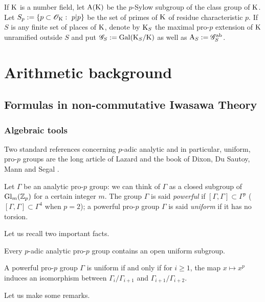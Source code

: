 \documentclass[12pt,a4paper,twoside,english]{smfart}
\def\K{{\rm K}}
\def\Z{{\mathbb Z}}
\def\G{{\mathcal G}}
\def\O{{\mathcal O}}
\def\p{{\mathfrak p}}
\def\Gl{{\rm Gl}}
\def\Gal{{\rm Gal}}
\def\ab{{\mathrm{ab}}}
\def\A{{\rm A}}
\begin{document}
If $\K$ is a number field, let  $\A(\K)$ be the $p$-Sylow subgroup of the class group of $\K$. Let $S_p:=\{ \p \subset \O_\K: \ \p | p\}$ be the set of primes
of $\K$ of residue characteristic $p$.
If $S$ is any finite set of places of $\K$, denote by  $\K_S$ the maximal pro-$p$ extension of $\K$ unramified outside $S$ and put $\G_S:=\Gal(\K_S/\K)$ as well as  $\A_S:= \G_S^{\ab}$. 





\section{Arithmetic background}


\subsection{Formulas in non-commutative Iwasawa Theory}


\subsubsection{Algebraic tools} \label{sectionuniform}

Two standard  references concerning $p$-adic analytic and in particular, uniform, pro-$p$ groups  are the long article of Lazard \cite{lazard} and the book of Dixon, Du Sautoy, Mann and Segal  \cite{DSMN}.

\medskip

Let $\Gamma$ be an analytic pro-$p$ group: we can think of $\Gamma$ as a closed subgroup of $\Gl_m(\Z_p)$ for a certain integer $m$. The group $\Gamma$ is said \emph{powerful} if $  [\Gamma,\Gamma]\subset \Gamma^p $ ($  [\Gamma,\Gamma] \subset \Gamma^4$ when $p=2$); a powerful pro-$p$ group $\Gamma$ is said  \emph{uniform} if it has no torsion. 

Let us recall two important facts.


\begin{theo}
Every  $p$-adic analytic pro-$p$ group contains an open uniform subgroup. 
\end{theo}

\begin{theo}\label{isomorphismxp}
A powerful pro-$p$ group $\Gamma $ is uniform if and only if for $i\geq 1$,
the map $x\mapsto x^p$ induces an isomorphism between $\Gamma_{i}/\Gamma_{i+1}$ and $ \Gamma_{i+1}/\Gamma_{i+2}$.
\end{theo}

Let us make some remarks.
\end{document}

